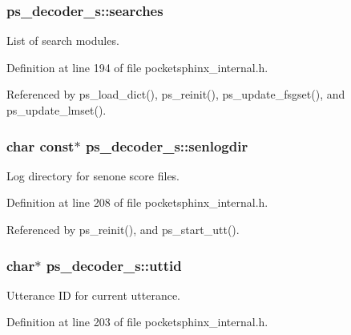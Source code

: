 \subsubsection[{searches}]{ {\bf ps\-\_\-decoder\-\_\-s\-::searches}}\label{structps__decoder__s_aa04a75334c8bc39c6e1dc4b1de1d760f}


\-List of search modules. 



\-Definition at line 194 of file pocketsphinx\-\_\-internal.\-h.



\-Referenced by ps\-\_\-load\-\_\-dict(), ps\-\_\-reinit(), ps\-\_\-update\-\_\-fsgset(), and ps\-\_\-update\-\_\-lmset().

\subsubsection[{senlogdir}]{\setlength{\rightskip}{0pt plus 5cm}char const$\ast$ {\bf ps\-\_\-decoder\-\_\-s\-::senlogdir}}\label{structps__decoder__s_a0ed3476113fe3d63b13ac5e8da3f3b4f}


\-Log directory for senone score files. 



\-Definition at line 208 of file pocketsphinx\-\_\-internal.\-h.



\-Referenced by ps\-\_\-reinit(), and ps\-\_\-start\-\_\-utt().

\subsubsection[{uttid}]{\setlength{\rightskip}{0pt plus 5cm}char$\ast$ {\bf ps\-\_\-decoder\-\_\-s\-::uttid}}\label{structps__decoder__s_a0c21a99a0cb1e71cf7811f99cc17c105}


\-Utterance \-I\-D for current utterance. 



\-Definition at line 203 of file pocketsphinx\-\_\-internal.\-h.



